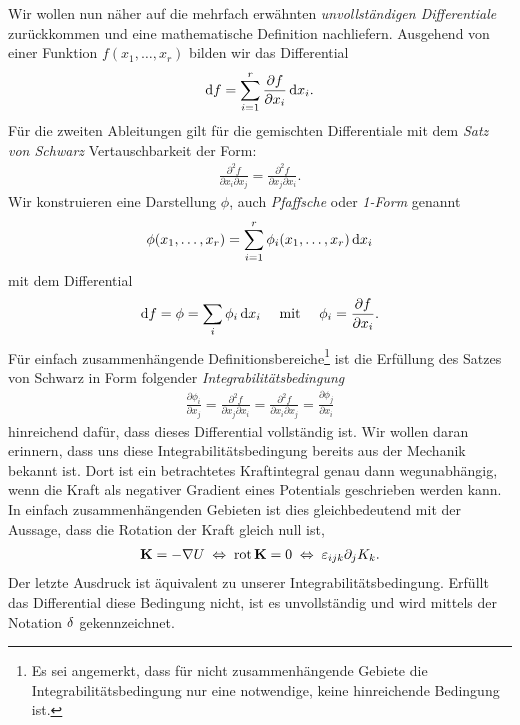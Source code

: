 Wir wollen nun näher auf die mehrfach erwähnten \emph{unvollständigen Differentiale} zurückkommen und eine mathematische Definition nachliefern. Ausgehend von einer Funktion $f(x_1,\ldots,x_r)$ bilden wir das Differential
\begin{align*}
    \mathop{}\!\mathrm{d} f = \sum_{i=1}^r \frac{\partial f}{\partial x_i} \mathop{}\!\mathrm{d} x_i.
\end{align*}
Für die zweiten Ableitungen gilt für die gemischten Differentiale mit dem \emph{Satz von Schwarz} Vertauschbarkeit der Form:
\begin{align*}
    \frac{\partial ^2 f}{\partial x_i \partial x_j} = \frac{\partial ^2 f}{\partial x_j \partial x_i}.
\end{align*}
Wir konstruieren eine Darstellung $\phi$, auch \emph{Pfaffsche} oder \emph{1-Form} genannt
\begin{align*}
    \phi (x_1,\ldots,x_r)=\sum _{i=1}^r \phi_i(x_1,\ldots,x_r)\mathop{}\!\mathrm{d} x_i
\end{align*}
mit dem Differential
\begin{align*}
    \mathop{}\!\mathrm{d} f = \phi = \sum_i \phi_i \mathop{}\!\mathrm{d} x_i \quad\text{ mit }\quad \phi_i = \frac{\partial f}{\partial x_i}.
\end{align*}
Für einfach zusammenhängende Definitionsbereiche\footnote{Es sei angemerkt, dass für nicht zusammenhängende Gebiete die Integrabilitätsbedingung nur eine notwendige, keine hinreichende Bedingung ist.} ist die Erfüllung des Satzes von Schwarz in Form folgender \emph{Integrabilitätsbedingung}
\begin{align*}
    \frac{\partial \phi_i}{\partial x_j}=\frac{\partial^2f}{\partial x_j\partial x_i}=\frac{\partial^2f}{\partial x_i\partial x_j}=\frac{\partial \phi_j}{\partial x_i}
\end{align*}
hinreichend dafür, dass dieses Differential vollständig ist.
Wir wollen daran erinnern, dass uns diese Integrabilitätsbedingung bereits aus der Mechanik bekannt ist. Dort ist ein betrachtetes Kraftintegral genau dann wegunabhängig, wenn die Kraft als negativer Gradient eines Potentials geschrieben werden kann. In einfach zusammenhängenden Gebieten ist dies gleichbedeutend mit der Aussage, dass die Rotation der Kraft gleich null ist,
\begin{align*}
    \mathbf{K}=-\nabla U \;\Leftrightarrow\; \operatorname{rot}\mathbf{K}=0 \;\Leftrightarrow\; \varepsilon_{ijk}\partial_jK_k.
\end{align*}
Der letzte Ausdruck ist äquivalent zu unserer Integrabilitätsbedingung.
Erfüllt das Differential diese Bedingung nicht, ist es unvollständig und wird mittels der Notation $\mathop{}\!\delta$ gekennzeichnet.

